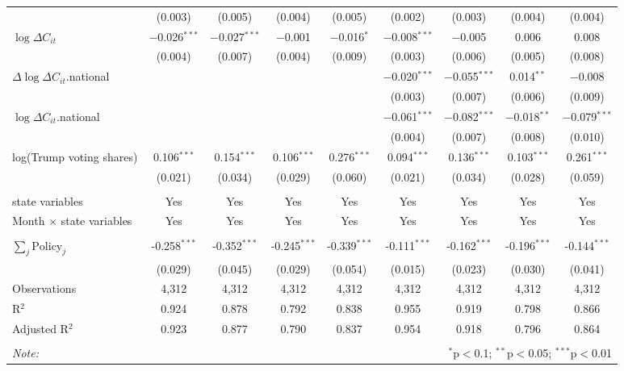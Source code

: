 \begin{tabular}{@{\extracolsep{1pt}}lcccccccc}
  & (0.003) & (0.005) & (0.004) & (0.005) & (0.002) & (0.003) & (0.004) & (0.004) \\ 
  $\log \Delta C_{it}$ & $-$0.026$^{***}$ & $-$0.027$^{***}$ & $-$0.001 & $-$0.016$^{*}$ & $-$0.008$^{***}$ & $-$0.005 & 0.006 & 0.008 \\ 
  & (0.004) & (0.007) & (0.004) & (0.009) & (0.003) & (0.006) & (0.005) & (0.008) \\ 
  $\Delta \log \Delta C_{it}$.national &  &  &  &  & $-$0.020$^{***}$ & $-$0.055$^{***}$ & 0.014$^{**}$ & $-$0.008 \\ 
  &  &  &  &  & (0.003) & (0.007) & (0.006) & (0.009) \\ 
  $\log \Delta C_{it}$.national &  &  &  &  & $-$0.061$^{***}$ & $-$0.082$^{***}$ & $-$0.018$^{**}$ & $-$0.079$^{***}$ \\ 
  &  &  &  &  & (0.004) & (0.007) & (0.008) & (0.010) \\ 
  log(Trump voting shares) & 0.106$^{***}$ & 0.154$^{***}$ & 0.106$^{***}$ & 0.276$^{***}$ & 0.094$^{***}$ & 0.136$^{***}$ & 0.103$^{***}$ & 0.261$^{***}$ \\ 
  & (0.021) & (0.034) & (0.029) & (0.060) & (0.021) & (0.034) & (0.028) & (0.059) \\ 
 \hline \\[-1.8ex] 
state variables & Yes & Yes & Yes & Yes & Yes & Yes & Yes & Yes \\ 
Month $\times$ state variables & Yes & Yes & Yes & Yes & Yes & Yes & Yes & Yes \\ 
\hline \\[-1.8ex] 
$\sum_j \mathrm{Policy}_j$ & -0.258$^{***}$ & -0.352$^{***}$ & -0.245$^{***}$ & -0.339$^{***}$ & -0.111$^{***}$ & -0.162$^{***}$ & -0.196$^{***}$ & -0.144$^{***}$ \\ 
 & (0.029) & (0.045) & (0.029) & (0.054) & (0.015) & (0.023) & (0.030) & (0.041) \\ 
Observations & 4,312 & 4,312 & 4,312 & 4,312 & 4,312 & 4,312 & 4,312 & 4,312 \\ 
R$^{2}$ & 0.924 & 0.878 & 0.792 & 0.838 & 0.955 & 0.919 & 0.798 & 0.866 \\ 
Adjusted R$^{2}$ & 0.923 & 0.877 & 0.790 & 0.837 & 0.954 & 0.918 & 0.796 & 0.864 \\ 
\hline 
\hline \\[-1.8ex] 
\textit{Note:}  & \multicolumn{8}{r}{$^{*}$p$<$0.1; $^{**}$p$<$0.05; $^{***}$p$<$0.01} \\ 
\end{tabular} 